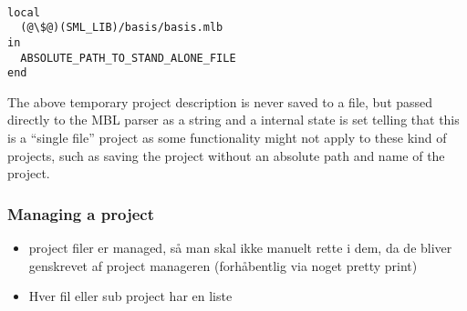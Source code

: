 
\begin{example}\
\begin{lstlisting}
local
  (@\$@)(SML_LIB)/basis/basis.mlb
in
  ABSOLUTE_PATH_TO_STAND_ALONE_FILE
end
\end{lstlisting}
\end{example}

The above temporary project description is never saved to a file, but passed
directly to the MBL parser as a string and a internal state is set telling that
this is a ``single file'' project as some functionality might not apply to these
kind of projects, such as saving the project without an absolute path and name
of the project.


\subsubsection{Managing a project}


\begin{itemize}
\item project filer er managed, så man skal ikke manuelt rette i dem, da de
  bliver genskrevet af project manageren (forhåbentlig via noget pretty print)

\item Hver fil eller sub project har en liste 
\end{itemize}

